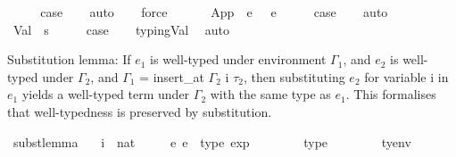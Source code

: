 \begin{isabellebody}
\ \ \isamarkupfalse%
\ \isamarkupfalse%
\ {\isacharquery}{\kern0pt}case\isanewline
\ \ \isamarkupfalse%
\ auto\isanewline
\ \ \isamarkupfalse%
\ force\isanewline
\ \ \isamarkupfalse%
\isanewline
{}\isamarkupfalse%
\isanewline
\ \ \isamarkupfalse%
\ {\isacharparenleft}{\kern0pt}App\ {\isasymGamma}\ e{}\ {\isasymtau}{}\ {\isasymtau}{}\ e{}{\isacharparenright}{\kern0pt}\isanewline
\ \ \isamarkupfalse%
\ \isamarkupfalse%
\ {\isacharquery}{\kern0pt}case\isanewline
\ \ \isamarkupfalse%
\ auto\isanewline
\ \ \isamarkupfalse%
\isanewline
{}\isamarkupfalse%
\isanewline
\ \ \isamarkupfalse%
\ {\isacharparenleft}{\kern0pt}Val\ {\isasymGamma}\ s{\isacharparenright}{\kern0pt}\isanewline
\ \ \isamarkupfalse%
\ \isamarkupfalse%
\ {\isacharquery}{\kern0pt}case\isanewline
\ \ \isamarkupfalse%
\ typing{\isachardot}{\kern0pt}Val\ \isamarkupfalse%
\ auto\isanewline
{}\isamarkupfalse%
%
\endisatagproof
{\isafoldproof}%
%
\isadelimproof
%
\endisadelimproof
%
\begin{isamarkuptext}%
Substitution lemma:
  If $e_1$ is well-typed under environment $\Gamma_1$,
  and $e_2$ is well-typed under $\Gamma_2$,
  and $\Gamma_1$ = insert\_at $\Gamma_2$ i $\tau_2$,
  then substituting $e_2$ for variable i in $e_1$ yields a well-typed term
  under $\Gamma_2$ with the same type as $e_1$.
  This formalises that well-typedness is preserved by substitution.%
\end{isamarkuptext}\isamarkuptrue%
\isamarkupfalse%
\ subst{\isacharunderscore}{\kern0pt}lemma{\isacharcolon}{\kern0pt}\isanewline
\ \ \ i\ {\isacharcolon}{\kern0pt}{\isacharcolon}{\kern0pt}\ nat\isanewline
\ \ \ \ \ e{}\ e{}\ {\isacharcolon}{\kern0pt}{\isacharcolon}{\kern0pt}\ {\isachardoublequoteopen}type\ exp{\isachardoublequoteclose}\isanewline
\ \ \ \ \ {\isasymtau}{}\ {\isasymtau}{}\ {\isacharcolon}{\kern0pt}{\isacharcolon}{\kern0pt}\ type\isanewline
\ \ \ \ \ {\isasymGamma}{}\ {\isasymGamma}{}\ {\isacharcolon}{\kern0pt}{\isacharcolon}{\kern0pt}\ {\isachardoublequoteopen}tyenv{\isachardoublequoteclose}\isanewline

\end{isabellebody}
